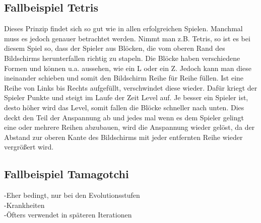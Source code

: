 \subsection{Fallbeispiel Tetris} 
Dieses Prinzip findet sich so gut wie in allen erfolgreichen Spielen. Manchmal muss es jedoch genauer betrachtet werden. Nimmt man z.B. Tetris, so ist es bei diesem Spiel so, dass der Spieler aus Blöcken, die vom oberen Rand des Bildschirms herunterfallen richtig zu stapeln. Die Blöcke haben verschiedene Formen und können u.a. aussehen, wie ein L oder ein Z. Jedoch kann man diese ineinander schieben und somit den Bildschirm Reihe für Reihe füllen. Ist eine Reihe von Links bis Rechts aufgefüllt, verschwindet diese wieder. Dafür kriegt der Spieler Punkte und steigt im Laufe der Zeit Level auf. Je besser ein Spieler ist, desto höher wird das Level, somit fallen die Blöcke schneller nach unten. Dies deckt den Teil der Anspannung ab und jedes mal wenn es dem Spieler gelingt eine oder mehrere Reihen abzubauen, wird die Anspannung wieder gelöst, da der Abstand zur oberen Kante des Bildschirms mit jeder entfernten Reihe wieder vergrößert wird.

\subsection{Fallbeispiel Tamagotchi} 
-Eher bedingt, nur bei den Evolutionsstufen\\
-Krankheiten\\
-Öfters verwendet in späteren Iterationen